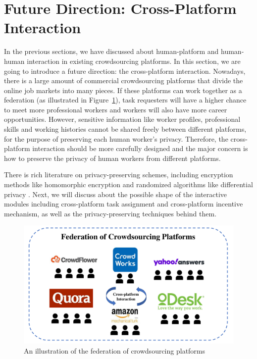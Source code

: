 \documentclass[11pt]{article}
\newcommand\figref[1]{Figure~\ref{#1}}
\begin{document}
\section{Future Direction: Cross-Platform Interaction}

In the previous sections, we have discussed about human-platform and human-human interaction in existing crowdsourcing platforms.
In this section, we are going to introduce a future direction: the cross-platform interaction.
Nowadays, there is a large amount of commercial crowdsourcing platforms that divide the online job markets into many pieces.
If these platforms can work together as a federation (as illustrated in \figref{fig:federation}), task requesters will have a higher chance to meet more professional workers and workers will also have more career opportunities.
However, sensitive information like worker profiles, professional skills and working histories cannot be shared freely between different platforms, for the purpose of preserving each human worker's privacy.
Therefore, the cross-platform interaction should be more carefully designed and the major concern is how to preserve the privacy of human workers from different platforms.

There is rich literature on privacy-preserving schemes, including encryption methods like homomorphic encryption \cite{FHE} and randomized algorithms like differential privacy \cite{ICALP06}.
Next, we will discuss about the possible shape of the interactive modules including cross-platform task assignment and cross-platform incentive mechanism, as well as the privacy-preserving techniques behind them.

\begin{figure}
	\centering
	\includegraphics[scale=0.45]{figs/federation.pdf}
	
	\caption{An illustration of the federation of crowdsourcing platforms}
	\label{fig:federation}
\end{figure}
\end{document}
